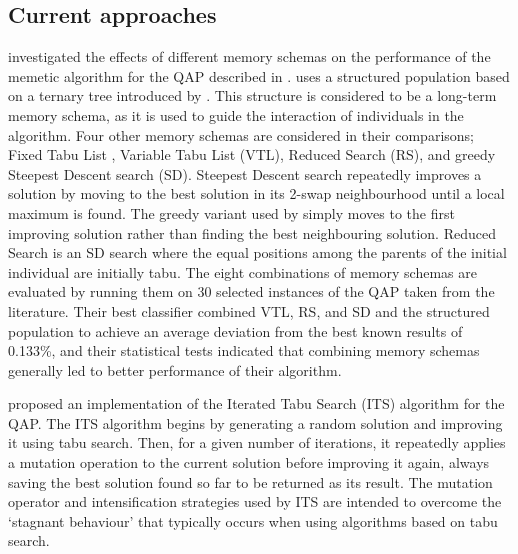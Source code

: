 \subsection{Current approaches} {
    \label{sec:approaches}




	\citet{Meneses:2011hg} investigated the effects of different memory schemas on the performance of the memetic algorithm for the QAP described in \citet{Inostroza:2008md}.
	\citeauthor{Meneses:2011hg} uses a structured population based on a ternary tree introduced by \citet{Inostroza:2008md}. This structure is considered to be a long-term memory schema, as it is used to guide the interaction of individuals in the algorithm.
	Four other memory schemas are considered in their comparisons; Fixed Tabu List \citep{glover1989tabu}, Variable Tabu List (VTL), Reduced Search (RS), and greedy Steepest Descent search (SD).
	Steepest Descent search repeatedly improves a solution by moving to the best solution in its 2-swap neighbourhood until a local maximum is found. The greedy variant used by \citeauthor{Meneses:2011hg} simply moves to the first improving solution rather than finding the best neighbouring solution.
	Reduced Search is an SD search where the equal positions among the parents of the initial individual are initially tabu.
	The eight combinations of memory schemas are evaluated by running them on 30 selected instances of the QAP taken from the literature.
	Their best classifier combined VTL, RS, and SD and the structured population to achieve an average deviation from the best known results of 0.133\%, and their statistical tests indicated that combining memory schemas generally led to better performance of their algorithm.





	\citet{Misevicius:2012dj} proposed an implementation of the Iterated Tabu Search (ITS) algorithm for the QAP.
	The ITS algorithm begins by generating a random solution and improving it using tabu search. Then, for a given number of iterations, it repeatedly applies a mutation operation to the current solution before improving it again, always saving the best solution found so far to be returned as its result. The mutation operator and intensification strategies used by ITS are intended to overcome the `stagnant behaviour' that typically occurs when using algorithms based on tabu search.

}
